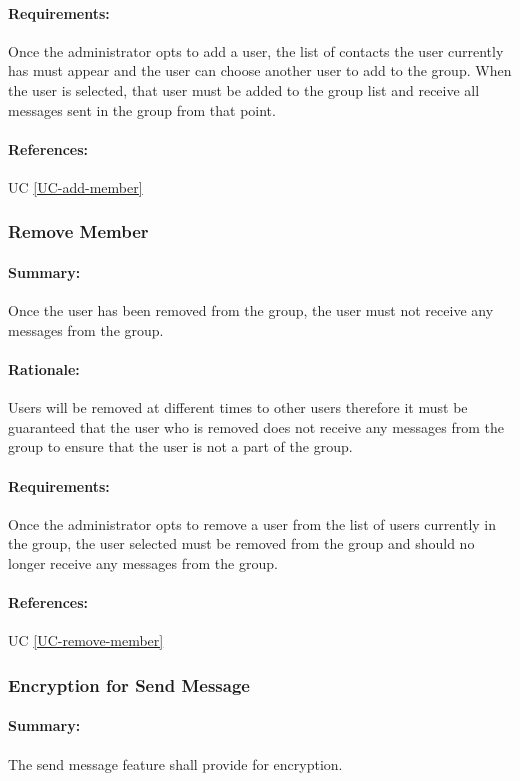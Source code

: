 \documentclass[11pt]{article}
\begin{document}
\paragraph{Requirements:}
Once the administrator opts to add a user, the list of contacts the user currently has must appear and the user can choose another user to add to the group. When the user is selected, that user must be added to the group list and receive all messages sent in the group from that point.
\paragraph{References:} UC \ref{UC-add-member}

\subsubsection{Remove Member} \label{FR-remove-member}
\paragraph{Summary:}
Once the user has been removed from the group, the user must not receive any messages from the group.
\paragraph{Rationale:}
Users will be removed at different times to other users therefore it must be guaranteed that the user who is removed does not receive any messages from the group to ensure that the user is not a part of the group.
\paragraph{Requirements:}
Once the administrator opts to remove a user from the list of users currently in the group, the user selected must be removed from the group and should no longer receive any messages from the group.
\paragraph{References:} UC \ref{UC-remove-member}

\subsubsection{Encryption for Send Message} \label{FR-send-message-encrypted}
\paragraph{Summary:} The send message feature shall provide for encryption.
\end{document}
